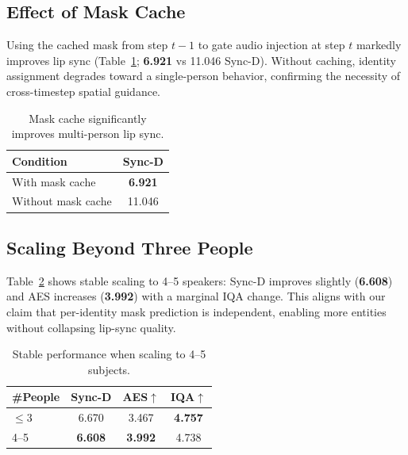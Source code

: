 \documentclass{article} %
\begin{document}
\subsection{Effect of Mask Cache}
Using the cached mask from step $t{-}1$ to gate audio injection at step $t$ markedly improves lip sync (Table~\ref{tab:mask_cache}; \textbf{6.921} vs 11.046 Sync-D). Without caching, identity assignment degrades toward a single-person behavior, confirming the necessity of cross-timestep spatial guidance.


\begin{table}[H]
\centering
\caption{Mask cache significantly improves multi-person lip sync.}
\begin{tabular}{lc}
\toprule
Condition & Sync-D \\
\midrule
With mask cache & \textbf{6.921} \\
Without mask cache & 11.046 \\
\bottomrule
\end{tabular}
\label{tab:mask_cache}
\end{table}


\subsection{Scaling Beyond Three People}
Table~\ref{tab:more_people} shows stable scaling to 4–5 speakers: Sync-D improves slightly (\textbf{6.608}) and AES increases (\textbf{3.992}) with a marginal IQA change. This aligns with our claim that per-identity mask prediction is independent, enabling more entities without collapsing lip-sync quality.

\begin{table}[H]
\centering
\caption{Stable performance when scaling to 4–5 subjects.}
\begin{tabular}{lccc}
\toprule
\#People & Sync-D & AES$\uparrow$ & IQA$\uparrow$ \\
\midrule
$\leq$3  & 6.670 & 3.467 & \textbf{4.757} \\
4--5     & \textbf{6.608} & \textbf{3.992} & 4.738 \\
\bottomrule
\end{tabular}
\label{tab:more_people}
\end{table}
\end{document}
